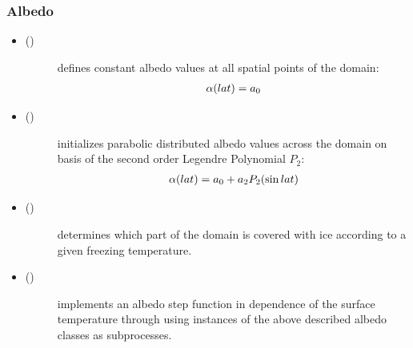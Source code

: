 \documentclass[a4paper,10pt,english]{sphinxmanual}
\begin{document}
\subsubsection{Albedo}
\label{models:albedo}\begin{itemize}
\item {} \begin{description}
\item[{{\hyperref[api/climlab.surface:climlab.surface.albedo.ConstantAlbedo]{\emph{}}} ()}] \leavevmode
defines constant albedo values at all spatial points of the domain:
\begin{gather}
\begin{split}\alpha(lat) = a_0\end{split}\notag
\end{gather}
\end{description}

\item {} \begin{description}
\item[{{\hyperref[api/climlab.surface:climlab.surface.albedo.P2Albedo]{\emph{}}} ()}] \leavevmode
initializes parabolic distributed albedo values across the domain on basis of the second order Legendre Polynomial \(P_2\):
\begin{gather}
\begin{split}\alpha(lat) = a_0 + a_2 P_2(\sin lat)\end{split}\notag
\end{gather}
\end{description}

\item {} \begin{description}
\item[{{\hyperref[api/climlab.surface:climlab.surface.albedo.Iceline]{\emph{}}} ()}] \leavevmode
determines which part of the domain is covered with ice according to a given freezing temperature.

\end{description}

\item {} \begin{description}
\item[{{\hyperref[api/climlab.surface:climlab.surface.albedo.StepFunctionAlbedo]{\emph{}}} ()}] \leavevmode
implements an albedo step function in dependence of the surface temperature through using instances of the above described albedo classes as subprocesses.

\end{description}

\end{itemize}
\end{document}
